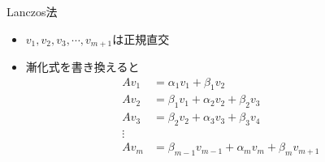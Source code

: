 \begin{frame}[t,fragile]{Lanczos法}
  \begin{itemize}
  \item $v_1,v_2,v_3,\cdots,v_{m+1}$は正規直交
  \item 漸化式を書き換えると
    \begin{align*}
      Av_1 &= \alpha_1 v_1 + \beta_1 v_2 \\
      Av_2 &= \beta_1 v_1 + \alpha_2 v_2 + \beta_2 v_3 \\
      Av_3 &= \beta_2 v_2 + \alpha_3 v_3 + \beta_3 v_4 \\
      \vdots \\
      Av_{m} &= \beta_{m-1} v_{m-1} + \alpha_m v_m + \beta_m v_{m+1}
    \end{align*}
  \end{itemize}
\end{frame}

